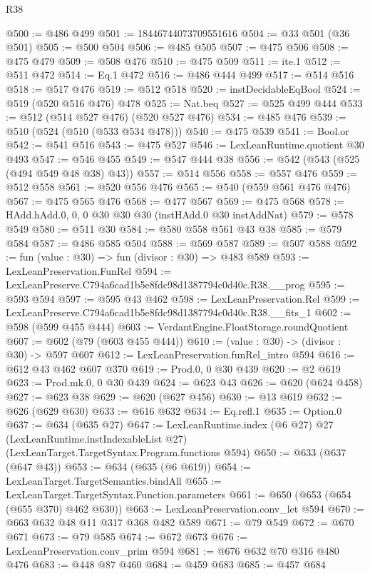 \begin{lexlean}{R38}
\begin{coremodule}
@500 := @486 @499
@501 := 18446744073709551616
@504 := @33 @501 (@36 @501)
@505 := @500 @504
@506 := @485 @505
@507 := @475 @506
@508 := @475 @479
@509 := @508 @476
@510 := @475 @509
@511 := ite.{1}
@512 := @511 @472
@514 := Eq.{1} @472
@516 := @486 @444 @499
@517 := @514 @516
@518 := @517 @476
@519 := @512 @518
@520 := instDecidableEqBool
@524 := @519 (@520 @516 @476) @478
@525 := Nat.beq
@527 := @525 @499 @444
@533 := @512 (@514 @527 @476) (@520 @527 @476)
@534 := @485 @476
@539 := @510 (@524 (@510 (@533 @534 @478)))
@540 := @475 @539
@541 := Bool.or
@542 := @541 @516
@543 := @475 @527
@546 := LexLeanRuntime.quotient @30 @493
@547 := @546 @455
@549 := @547 @444 @38
@556 := @542 (@543 (@525 (@494 @549 @48 @38) @43))
@557 := @514 @556
@558 := @557 @476
@559 := @512 @558
@561 := @520 @556 @476
@565 := @540 (@559 @561 @476 @476)
@567 := @475 @565 @476
@568 := @477 @567
@569 := @475 @568
@578 := HAdd.hAdd.{0, 0, 0} @30 @30 @30 (instHAdd.{0} @30 instAddNat)
@579 := @578 @549
@580 := @511 @30
@584 := @580 @558 @561 @43 @38
@585 := @579 @584
@587 := @486 @585 @504
@588 := @569 @587
@589 := @507 @588
@592 := fun (value : @30) => fun (divisor : @30) => @483 @589
@593 := LexLeanPreservation.FunRel
@594 := LexLeanPreserve.C794a6cad1b5e8fdc98d1387794c0d40c.R38.__prog
@595 := @593 @594
@597 := @595 @43 @462
@598 := LexLeanPreservation.Rel
@599 := LexLeanPreserve.C794a6cad1b5e8fdc98d1387794c0d40c.R38.__fits_1
@602 := @598 (@599 @455 @444)
@603 := VerdantEngine.FloatStorage.roundQuotient
@607 := @602 (@79 (@603 @455 @444))
@610 := (value : @30) -> (divisor : @30) -> @597 @607
@612 := LexLeanPreservation.funRel_intro @594
@616 := @612 @43 @462 @607 @370
@619 := Prod.{0, 0} @30 @439
@620 := @2 @619
@623 := Prod.mk.{0, 0} @30 @439
@624 := @623 @43
@626 := @620 (@624 @458)
@627 := @623 @38
@629 := @620 (@627 @456)
@630 := @13 @619
@632 := @626 (@629 @630)
@633 := @616 @632
@634 := Eq.refl.{1}
@635 := Option.{0}
@637 := @634 (@635 @27)
@647 := LexLeanRuntime.index
    (@6 @27)
    @27
    (LexLeanRuntime.instIndexableList @27)
    (LexLeanTarget.TargetSyntax.Program.functions @594)
@650 := @633 (@637 (@647 @43))
@653 := @634 (@635 (@6 @619))
@654 := LexLeanTarget.TargetSemantics.bindAll
@655 := LexLeanTarget.TargetSyntax.Function.parameters
@661 := @650 (@653 (@654 (@655 @370) @462 @630))
@663 := LexLeanPreservation.conv_let @594
@670 := @663 @632 @48 @11 @317 @368 @482 @589
@671 := @79 @549
@672 := @670 @671
@673 := @79 @585
@674 := @672 @673
@676 := LexLeanPreservation.conv_prim @594
@681 := @676 @632 @70 @316 @480 @476
@683 := @448 @87 @460
@684 := @459 @683
@685 := @457 @684

\end{coremodule}
\end{lexlean}
